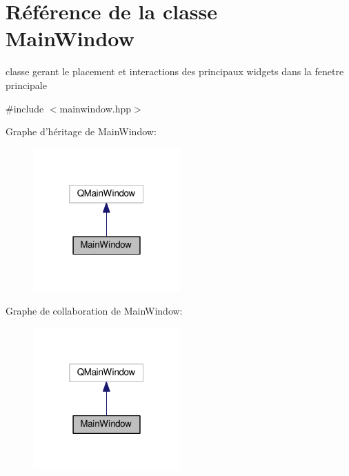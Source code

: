 \hypertarget{classMainWindow}{\section{Référence de la classe Main\+Window}
\label{classMainWindow}
}


classe gerant le placement et interactions des principaux widgets dans la fenetre principale  




{\ttfamily \#include $<$mainwindow.\+hpp$>$}



Graphe d'héritage de Main\+Window\+:\nopagebreak
\begin{figure}[H]
\begin{center}
\leavevmode
\includegraphics[width=160pt]{classMainWindow__inherit__graph}
\end{center}
\end{figure}


Graphe de collaboration de Main\+Window\+:\nopagebreak
\begin{figure}[H]
\begin{center}
\leavevmode
\includegraphics[width=160pt]{classMainWindow__coll__graph}
\end{center}
\end{figure}
